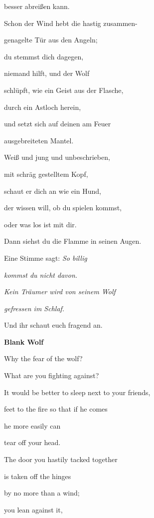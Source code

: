 besser abreißen kann.


\bigskip

Schon der Wind hebt die hastig zusammen-

genagelte Tür aus den Angeln;

du stemmst dich dagegen, 

niemand hilft, und der Wolf 

schlüpft, wie ein Geist aus der Flasche,

durch ein Astloch herein,


\bigskip

und setzt sich auf deinen am Feuer

ausgebreiteten Mantel.

Weiß und jung und unbeschrieben,

mit schräg gestelltem Kopf, 

schaut er dich an wie ein Hund,

der wissen will, ob du spielen kommst, 

oder was los ist mit dir.


\bigskip

Dann siehst du die Flamme in seinen Augen. 

Eine Stimme sagt: \emph{So billig }

\emph{
kommst du nicht davon.}

\emph{
Kein Träumer wird von seinem Wolf }

\emph{
gefressen im Schlaf.}


\bigskip

Und ihr schaut euch fragend an.


\bigskip

{\bfseries
Blank Wolf }


\bigskip

Why the fear of the wolf?

What are you fighting against?


\bigskip

It would be better to sleep next to your friends, 

feet to the fire so that if he comes 

he more easily can

tear off your head.


\bigskip

The door you hastily tacked together

is taken off the hinges

by no more than a wind;

you lean against it,

